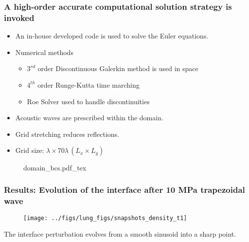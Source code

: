 \begin{frame} \frametitle{A high-order accurate computational solution strategy is invoked}
  \begin{minipage}{0.62\textwidth}
    \begin{itemize}
    \item An in-house developed code is used to solve the Euler equations.
    \item Numerical methods
      \begin{itemize}
      \item $3^{rd}$ order Discontinuous Galerkin method is used in space
      \item $4^{th}$ order Runge-Kutta time marching
      \item Roe Solver used to handle discontinuities
      \end{itemize}
    \item Acoustic waves are prescribed within the domain.
    \item Grid stretching reduces reflections.
    \item Grid size: $\lambda \times 70\lambda \, (L_x \times L_y)$
    \end{itemize}
  \end{minipage}
  \hfill%
  \begin{minipage}{0.34\textwidth}
    \begin{figure}
      \centering
      \def\svgwidth{\textwidth}
      {\footnotesize
        {domain_bcs.pdf_tex}%
      }
    \end{figure}
  \end{minipage}

\end{frame}
\begin{frame} \frametitle{\vspace*{0.5cm}Results: Evolution of the interface after 10 MPa trapezoidal wave}
  \begin{figure}
    \centering
    \texttt{[image: ../figs/lung\_figs/snapshots\_density\_t1]}
  \end{figure}
  {\small
    The interface perturbation evolves from a smooth sinusoid into a sharp point.
  }
\end{frame}
